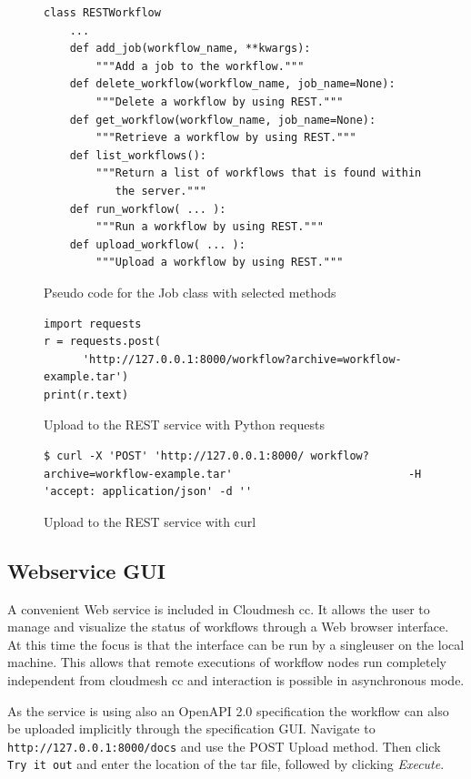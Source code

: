 \begin{figure}[t]
\begin{verbatim}
class RESTWorkflow
    ...
    def add_job(workflow_name, **kwargs):
        """Add a job to the workflow."""
    def delete_workflow(workflow_name, job_name=None):
        """Delete a workflow by using REST."""
    def get_workflow(workflow_name, job_name=None):
        """Retrieve a workflow by using REST."""
    def list_workflows():
        """Return a list of workflows that is found within
           the server."""
    def run_workflow( ... ):
        """Run a workflow by using REST."""
    def upload_workflow( ... ):
        """Upload a workflow by using REST."""
\end{verbatim}
\caption{Pseudo code for the Job class with selected methods}
\label{fig:code-workflow-rest-commandline}

\bigskip

\begin{verbatim}
import requests
r = requests.post(
      'http://127.0.0.1:8000/workflow?archive=workflow-example.tar')
print(r.text)
\end{verbatim}
\caption{Upload to the REST service with Python requests}
\label{fig:code-workflow-requests}

\bigskip

\begin{verbatim}
$ curl -X 'POST' 'http://127.0.0.1:8000/ workflow?archive=workflow-example.tar'                           -H 'accept: application/json' -d ''
\end{verbatim}%
\caption{Upload to the REST service with curl}
\label{fig:code-workflow-curl}

\end{figure}


\subsection{Webservice GUI}

A convenient Web service is included in Cloudmesh cc. It allows the user
to manage and visualize the status of workflows through a Web browser
interface. At this time the focus is that the interface can be run by a
singleuser on the local machine. This allows that remote executions of
workflow nodes run completely independent from cloudmesh cc and
interaction is possible in asynchronous mode.

As the service is using also an OpenAPI 2.0 specification the workflow
can also be uploaded implicitly through the specification
GUI. Navigate to \texttt{http://127.0.0.1:8000/docs} and use the POST
Upload method. Then click \texttt{Try\ it\ out} and enter the
location of the tar file, followed by clicking {\em Execute}.

